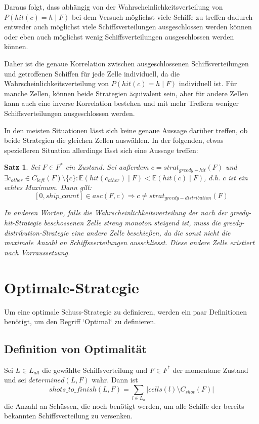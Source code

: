 \documentclass[a4paper,12pt]{llncs}
\numberwithin{equation}{section}
\newtheorem{satz}{Satz}
\begin{document}
Daraus folgt, dass abhängig von der Wahrscheinlichkeitsverteilung von $P(hit(c)=h \mid F)$ bei dem Versuch möglichst viele Schiffe zu treffen dadurch entweder auch möglichst viele Schiffsverteilungen ausgeschlossen werden können oder eben auch möglichst wenig Schiffsverteilungen ausgeschlossen werden können.

Daher ist die genaue Korrelation zwischen ausgeschlossenen Schiffsverteilungen und getroffenen Schiffen für jede Zelle individuell, da die Wahrscheinlichkeitsverteilung von $P(hit(c)=h \mid F)$ individuell ist. Für manche Zellen, können beide Strategien äquivalent sein, aber für andere Zellen kann auch eine inverse Korrelation bestehen und mit mehr Treffern weniger Schiffsverteilungen ausgeschlossen werden.

In den meisten Situationen lässt sich keine genaue Aussage darüber treffen, ob beide Strategien die gleichen Zellen auswählen. In der folgenden, etwas spezielleren Situation allerdings lässt sich eine Aussage treffen:

\begin{satz}
Sei $F\in F^*$ ein Zustand.
Sei außerdem $c=strat_{greedy-hit}(F)$ und \\
$\exists c_{other} \in C_{left}(F) \setminus \{c\}\colon \mathds{E}(hit(c_{other}) \mid F) < \mathds{E}(hit(c) \mid F)$, d.h. $c$ ist ein echtes Maximum.
Dann gilt:
\[
[0,ship\_count] \in asc(F, c) \Rightarrow c \neq strat_{greedy-distribution}(F)
\]

In anderen Worten, falls die Wahrscheinlichkeitsverteilung der nach der greedy-hit-Strategie beschossenen Zelle streng monoton steigend ist, muss die greedy-distribution-Strategie eine andere Zelle beschießen, da die sonst nicht die maximale Anzahl an Schiffsverteilungen ausschliesst. Diese andere Zelle existiert nach Vorraussetzung.
\end{satz}


\section{Optimale-Strategie}

Um eine optimale Schuss-Strategie zu definieren, werden ein paar Definitionen benötigt, um den Begriff `Optimal` zu definieren.

\subsection{Definition von Optimalität}

\begin{definition}
Sei $L\in L_{all}$ die gewählte Schiffsverteilung und $F\in F^*$ der momentane Zustand und sei $determined(L, F)$ wahr.
Dann ist
\[
shots\_to\_finish(L, F)=\sum_{l \in L_a}{|cells(l) \setminus C_{shot}(F)|}
\]
die Anzahl an Schüssen, die noch benötigt werden, um alle Schiffe der bereits bekannten Schiffsverteilung zu versenken.
\end{definition}
\end{document}
